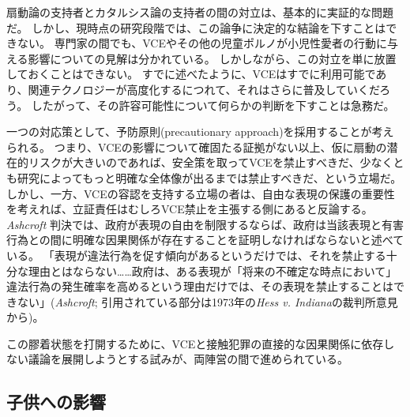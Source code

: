\documentclass[paper=a4,book,openany]{jlreq}
\begin{document}
扇動論の支持者とカタルシス論の支持者の間の対立は、基本的に実証的な問題だ。
しかし、現時点の研究段階では、この論争に決定的な結論を下すことはできない。
専門家の間でも、VCEやその他の児童ポルノが小児性愛者の行動に与える影響についての見解は分かれている\citep{ost02:_child_risk, quayle02:_child_pornog_inter, endrass09:_consum_inter_child_pornog_violen_sex_offen, seto11:_contac_sexual_offen_men_onlin, hessick11:_disen_child_pornog_child_sex_abuse}。
しかしながら、この対立を単に放置しておくことはできない。
すでに述べたように、VCEはすでに利用可能であり、関連テクノロジーが高度化するにつれて、それはさらに普及していくだろう。
したがって、その許容可能性について何らかの判断を下すことは急務だ。

一つの対応策として、予防原則(precautionary approach)を採用することが考えられる。
つまり、VCEの影響について確固たる証拠がない以上、仮に扇動の潜在的リスクが大きいのであれば、安全策を取ってVCEを禁止すべきだ、少なくとも研究によってもっと明確な全体像が出るまでは禁止すべきだ、という立場だ。
しかし、一方、VCEの容認を支持する立場の者は、自由な表現の保護の重要性を考えれば、立証責任はむしろVCE禁止を主張する側にあると反論する。
\emph{Ashcroft} 判決では、政府が表現の自由を制限するならば、政府は当該表現と有害行為との間に明確な因果関係が存在することを証明しなければならないと述べている。
「表現が違法行為を促す傾向があるというだけでは、それを禁止する十分な理由とはならない……政府は、ある表現が「将来の不確定な時点において」違法行為の発生確率を高めるという理由だけでは、その表現を禁止することはできない」(\emph{Ashcroft}; 引用されている部分は1973年の\emph{Hess v. Indiana}の裁判所意見から)。

この膠着状態を打開するために、VCEと接触犯罪の直接的な因果関係に依存しない議論を展開しようとする試みが、両陣営の間で進められている。

\subsection{子供への影響}
\end{document}
